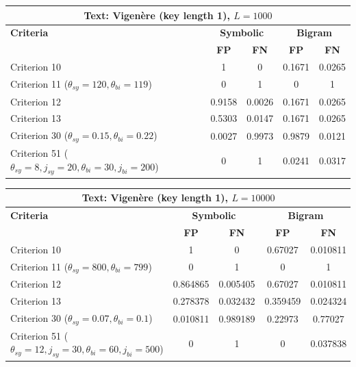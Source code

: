 \begin{center}
\renewcommand{\arraystretch}{1.2}
\setlength{\tabcolsep}{6pt}
\begin{tabular}{|l||c|c||c|c|}
\hline
\multicolumn{5}{|c|}{\textbf{Text: Vigenère (key length 1), $L=1000$}} \\
\hline
\textbf{Criteria} & \multicolumn{2}{c||}{\textbf{Symbolic}} & \multicolumn{2}{c|}{\textbf{Bigram}} \\
\hline
 & \textbf{FP} & \textbf{FN} & \textbf{FP} & \textbf{FN} \\
\hline
Criterion 10 & 1 & 0 & 0.1671 & 0.0265 \\
Criterion 11 ($\theta_{sy}=120, \theta_{bi}=119$) & 0 & 1 & 0 & 1 \\
Criterion 12 & 0.9158 & 0.0026 & 0.1671 & 0.0265 \\
Criterion 13 & 0.5303 & 0.0147 & 0.1671 & 0.0265 \\
Criterion 30 ($\theta_{sy}=0.15, \theta_{bi}=0.22$) & 0.0027 & 0.9973 & 0.9879 & 0.0121 \\
Criterion 51 ($\theta_{sy}=8, j_{sy}=20, \theta_{bi}=30, j_{bi}=200$) & 0 & 1 & 0.0241 & 0.0317 \\
\hline
\end{tabular}
\end{center}

\begin{center}
\renewcommand{\arraystretch}{1.2}
\setlength{\tabcolsep}{6pt}
\begin{tabular}{|l||c|c||c|c|}
\hline
\multicolumn{5}{|c|}{\textbf{Text: Vigenère (key length 1), $L=10000$}} \\
\hline
\textbf{Criteria} & \multicolumn{2}{c||}{\textbf{Symbolic}} & \multicolumn{2}{c|}{\textbf{Bigram}} \\
\hline
 & \textbf{FP} & \textbf{FN} & \textbf{FP} & \textbf{FN} \\
\hline
Criterion 10 & 1 & 0 & 0.67027 & 0.010811 \\
Criterion 11 ($\theta_{sy}=800, \theta_{bi}=799$) & 0 & 1 & 0 & 1 \\
Criterion 12 & 0.864865 & 0.005405 & 0.67027 & 0.010811 \\
Criterion 13 & 0.278378 & 0.032432 & 0.359459 & 0.024324 \\
Criterion 30 ($\theta_{sy}=0.07, \theta_{bi}=0.1$) & 0.010811 & 0.989189 & 0.22973 & 0.77027 \\
Criterion 51 ($\theta_{sy}=12, j_{sy}=30, \theta_{bi}=60, j_{bi}=500$) & 0 & 1 & 0 & 0.037838 \\
\hline
\end{tabular}
\end{center}

